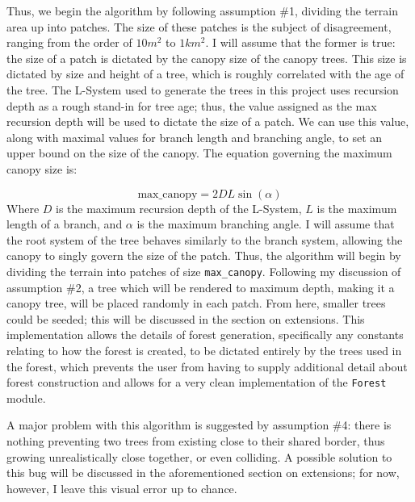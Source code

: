 \documentclass{article}
\newcommand{\tab}{\hspace*{2em}}
\begin{document}
    \tab Thus, we begin the algorithm by following assumption \#1, dividing the terrain area up
into patches. The size of these patches is the subject of disagreement, ranging from the order of
$10m^{2}$\cite{moorcroft01} to $1km^{2}$\cite{bugmann01}. I will assume that the former is true:
the size of a patch is dictated by the canopy size of the canopy trees. This size is dictated by
size and height of a tree, which is roughly correlated with the age of the tree. The L-System used
to generate the trees in this project uses recursion depth as a rough stand-in for tree age; thus,
the value assigned as the max recursion depth will be used to dictate the size of a patch. We can
use this value, along with maximal values for branch length and branching angle, to set an upper
bound on the size of the canopy. The equation governing the maximum canopy size is:


\begin{displaymath}
    \text{max\_canopy} = 2  D  L \sin(\alpha)
\end{displaymath}
Where $D$ is the maximum recursion depth of the L-System, $L$ is the maximum length of a branch,
and $\alpha$ is the maximum branching angle. I will assume that the root system of the tree
behaves similarly to the branch system, allowing the canopy to singly govern the size of the patch.
Thus, the algorithm will begin by dividing the terrain into patches of size \verb|max_canopy|.
Following my discussion of assumption \#2, a tree which will be rendered to maximum depth,
making it a canopy tree, will be placed randomly in each patch. From here, smaller trees could be
seeded; this will be discussed in the section on extensions. This implementation allows the details
of forest generation, specifically any constants relating to how the forest is created, to be
dictated entirely by the trees used in the forest, which prevents the user from having to supply
additional detail about forest construction and allows for a very clean implementation of the
\verb|Forest| module.

    \tab A major problem with this algorithm is suggested by assumption \#4: there is nothing
preventing two trees from existing close to their shared border, thus growing unrealistically close
together, or even colliding. A possible solution to this bug will be discussed in the
aforementioned section on extensions; for now, however, I leave this visual error up to chance.
\end{document}
